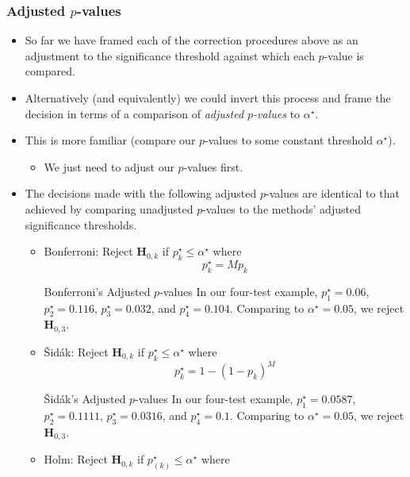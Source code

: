 \subsubsection*{Adjusted $ p $-values}
\begin{itemize}
    \item So far we have framed each of the correction procedures above as an adjustment to the significance
          threshold against which each $p$-value is compared.
    \item Alternatively (and equivalently) we could invert this process and frame the decision in terms of a
          comparison of \emph{adjusted $p$-values} to $ \alpha^\star $.
    \item This is more familiar (compare our $ p $-values to some constant threshold $ \alpha^\star $).
          \begin{itemize}
              \item We just need to adjust our $p$-values first.
          \end{itemize}
    \item The decisions made with the following adjusted $p$-values are identical to that achieved by comparing
          unadjusted $p$-values to the methods' adjusted significance thresholds.
          \begin{itemize}
              \item Bonferroni: Reject $ \mathbf{H}_{0,k} $ if $ p_k^\star\le \alpha^\star $ where
                    \[ p_k^\star=Mp_k \]
                    \begin{Example}{Bonferroni's Adjusted $ p $-values}{}
                        In our four-test example, $ p_1^\star=0.06 $, $ p_2^\star=0.116 $, $ p_3^\star=0.032 $, and $ p_4^\star=0.104 $.
                        Comparing to $ \alpha^\star=0.05 $, we reject $ \mathbf{H}_{0,3} $.
                    \end{Example}
              \item Šidák: Reject $ \mathbf{H}_{0,k} $ if $ p_k^\star\le \alpha^\star $ where
                    \[ p_k^\star=1-(1-p_k)^M \]
                    \begin{Example}{Šidák's Adjusted $ p $-values}{}
                        In our four-test example, $ p_1^\star=0.0587 $, $ p_2^\star=0.1111 $, $ p_3^\star=0.0316 $, and $ p_4^\star=0.1 $.
                        Comparing to $ \alpha^\star=0.05 $, we reject $ \mathbf{H}_{0,3} $.
                    \end{Example}
              \item Holm: Reject $ \mathbf{H}_{0,k} $ if $ p_{(k)}^\star\le \alpha^\star $ where

\end{itemize}
\end{itemize}
